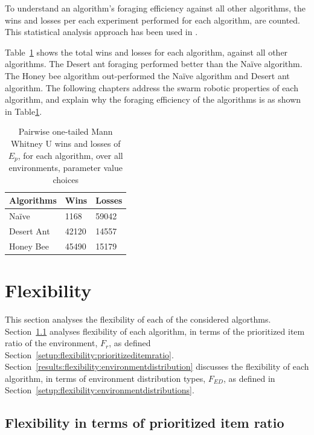 To understand an algorithm's foraging efficiency against all other algorithms, the wins and losses per each experiment performed for each algorithm, are counted. This statistical analysis approach has been used in \cite{helbig2013performance}.

Table~\ref{summarytable} shows the total wins and losses for each algorithm, against all other algorithms. The Desert ant foraging performed better than the Na\"ive algorithm. The Honey bee algorithm out-performed the Na\"ive algorithm and Desert ant algorithm. The following chapters address the swarm robotic properties of each algorithm, and explain why the foraging efficiency of the algorithms is as shown in Table\ref{summarytable}.


\begin{table}[]
\centering
\caption{Pairwise one-tailed Mann Whitney U wins and losses of $E_p$, for each algorithm, over all environments, parameter value choices }
\label{summarytable}
\begin{tabular}{@{}lll@{}}
\toprule
\textbf{Algorithms} & \textbf{Wins} & \textbf{Losses} \\ \midrule
Na\"ive               & 1168          & 59042           \\
Desert Ant          & 42120         & 14557           \\
Honey Bee           & 45490         & 15179           \\ \bottomrule
\end{tabular}
\end{table}

\section{Flexibility}
\label{results:flexibility}

This section analyses the flexibility of each of the considered algorthms. Section~\ref{results:prioritizeditemratio} analyses flexibility of each algorithm, in terms of the prioritized item ratio of the environment, $F_r$, as defined Section~\ref{setup:flexibility:prioritizeditemratio}. Section~\ref{results:flexibility:environmentdistribution} discusses the flexibility of each algorithm, in terms of environment distribution types, $F_{ED}$, as defined in Section~\ref{setup:flexibility:environmentdistributions}.

\subsection{Flexibility in terms of prioritized item ratio}
\label{results:prioritizeditemratio}

